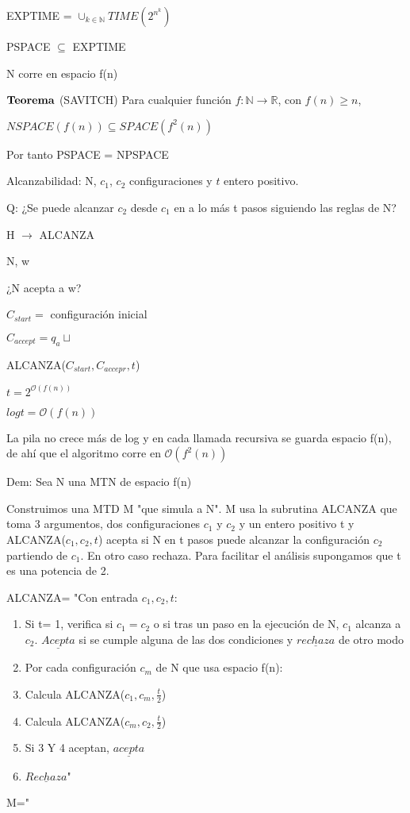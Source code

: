 \documentclass{homework}
\begin{document}
EXPTIME = $\cup_{k \in \mathds{N}} TIME (2^{n^k})$

PSPACE $\subseteq$ EXPTIME

N corre en espacio f(n)

$\bf{Teorema}$ (SAVITCH) Para cualquier función  $f: \mathds{N} \to \mathds{R}$, con $f(n) \geq n$,

$NSPACE(f(n)) \subseteq SPACE(f^2(n))$

Por tanto PSPACE = NPSPACE

Alcanzabilidad: N, $c_1$, $c_2$ configuraciones y $t$ entero positivo.

Q: ¿Se puede alcanzar $c_2$ desde $c_1$ en a lo más t pasos siguiendo las reglas de N?

H $\to$ ALCANZA

N, w

¿N acepta a w?

$C_{start} =$ configuración inicial

$C_{accept} = q_a \sqcup$

ALCANZA($C_{start}, C_{accepr}, t$)

$t = 2^{\mathcal{O}(f(n))}$

$log t = \mathcal{O}(f(n))$

La pila no crece más de log y en cada llamada recursiva se guarda espacio f(n), de ahí que el algoritmo corre en $\mathcal{O}(f^2(n))$


Dem: Sea N una MTN de espacio f(n)

Construimos una MTD M "que simula a N". M usa la subrutina ALCANZA que toma 3 argumentos, dos configuraciones $c_1$ y $c_2$ y un entero positivo t y ALCANZA($c_1,c_2,t$) acepta si N en t pasos puede alcanzar la configuración $c_2$ partiendo de $c_1$. En otro caso rechaza. Para facilitar el análisis supongamos que t es una potencia de 2.

ALCANZA= "Con entrada $c_1, c_2,t$:
\begin{enumerate}
	\item Si t= 1, verifica si $c_1 = c_2$ o si tras un paso en la ejecución de N, $c_1$ alcanza a $c_2$. $\underline{Acepta}$ si se cumple alguna de las dos condiciones y $\underline{rechaza}$ de otro modo
	\item Por cada configuración $c_m$ de N que usa espacio f(n):
	\item   Calcula ALCANZA($c_1,c_m,\frac{t}{2}$)
	\item   Calcula ALCANZA($c_m,c_2,\frac{t}{2}$)
	\item   Si 3 Y 4 aceptan, $\underline{acepta}$
	\item $\underline{Rechaza}$"
\end{enumerate}

M="
\end{document}
